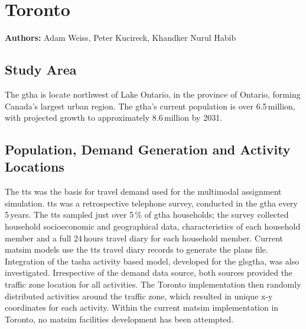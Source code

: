 \section{Toronto}
\label{sec:toronto}
\hfill \textbf{Authors:} Adam Weiss, Peter Kucireck, Khandker Nurul Habib


\subsection{Study Area}
The \gls{gtha} is locate northwest of Lake Ontario, in the province of Ontario, forming Canada’s largest urban region. The \gls{gtha}’s current population is over 6.5\,million, with projected growth to approximately 8.6\,million by 2031. 

\subsection{Population, Demand Generation and Activity Locations}
The \gls{tts} was the basis for travel demand used for the \gls{multimodal} assignment simulation. \gls{tts} was a retrospective telephone survey, conducted in the \gls{gtha} every 5\,years. The \gls{tts} sampled just over 5\,\% of \gls{gtha} households; the survey collected household socioeconomic and geographical data, characteristics of each household member and a full 24\,hours travel diary for each household member. Current \gls{matsim} models use the \gls{tts} travel diary records to generate the plans file. Integration of the \gls{tasha} activity based model, developed for the gls{gtha}, was also investigated. Irrespective of the demand data source, both sources provided the traffic zone location for all activities. The Toronto implementation then randomly distributed activities around the traffic zone, which resulted in unique x-y coordinates for each activity. Within the current \gls{matsim} implementation in Toronto, no \gls{matsim} facilities development has been attempted.

